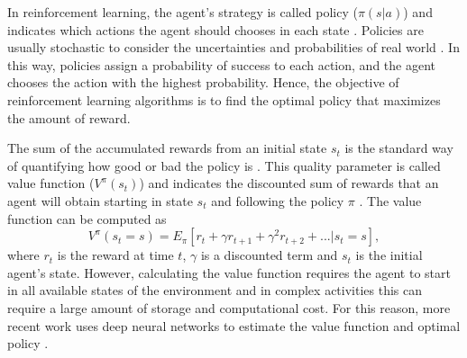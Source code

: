 In reinforcement learning, the agent's strategy is called policy ($\pi(s|a)$) and indicates which actions the agent should chooses in each state \cite{sutton2018reinforcement}. Policies are usually stochastic to consider the uncertainties and probabilities of real world \cite{tedrake2004stochastic}.  In this way, policies assign a probability of success to each action, and the agent chooses the action with the highest probability. Hence, the objective of reinforcement learning algorithms is to find the optimal policy that maximizes the amount of reward. 

The sum of the accumulated rewards from an initial state $s_t$ is the standard way of quantifying how good or bad the policy is \cite{sutton2018reinforcement}. This quality parameter is called value function ($V^{\pi}(s_t)$) and indicates the discounted sum of rewards that an agent will obtain starting in state $s_t$ and following the policy $\pi$ \cite{sutton2018reinforcement}. The value function can be computed as
\begin{equation*}
	V^{\pi}(s_t= s) = E_{\pi}  \left[r_t + \gamma r_{t+1} + \gamma^{2} r_{t+2}+ . . . | s_t = s \right],
\end{equation*}
\noindent where $r_t$ is the reward at time $t$, $\gamma$ is a discounted term and $s_t$ is the initial agent's state. However, calculating the value function requires the agent to start in all available states of the environment and in complex activities this can require a large amount of storage and computational cost. For this reason, more recent work uses deep neural networks to estimate the value function and optimal policy \cite{henderson2018deep}.


